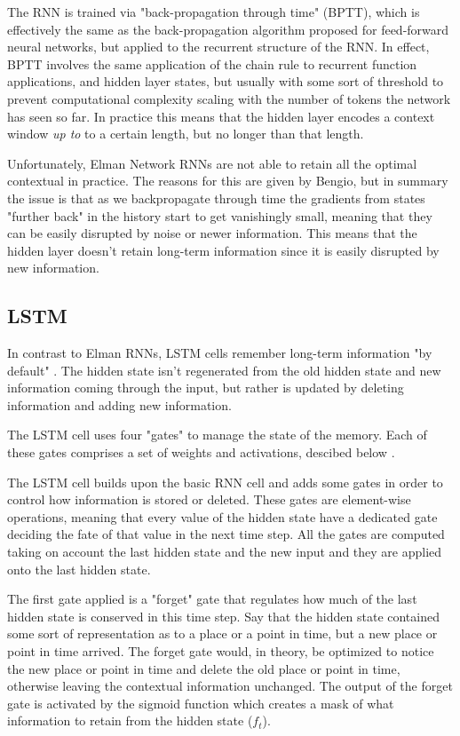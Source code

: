 \documentclass[a4paper]{article}
\begin{document}
The RNN is trained via "back-propagation through time" (BPTT), which is
effectively the same as the back-propagation algorithm proposed for feed-forward
neural networks, but applied to the recurrent structure of the RNN. In effect,
BPTT involves the same application of the chain rule to recurrent function
applications, and hidden layer states, but usually with some sort of threshold
to prevent computational complexity scaling with the number of tokens the
network has seen so far. In practice this means that the hidden layer encodes
a context window \emph{up to} to a certain length, but no longer than
that length.

Unfortunately, Elman Network RNNs are not able to retain all the optimal
contextual in practice. The reasons for this are given by Bengio\cite{Bengio94},
but in summary the issue is that as we backpropagate through time the gradients
from states "further back" in the history start to get vanishingly small, meaning
that they can be easily disrupted by noise or newer information. This means
that the hidden layer doesn't retain long-term information since it is easily
disrupted by new information.

\subsection{LSTM}
\label{sec:lstm}
In contrast to Elman RNNs, LSTM cells remember long-term information "by default" \cite{hochreiter97}.
The hidden state isn't regenerated from the old hidden state and new information coming
through the input, but rather is updated by deleting information and adding new
information.

The LSTM cell uses four "gates" to manage the state of the memory. Each of these
gates comprises a set of weights and activations, descibed below \cite{colah2015}.

The LSTM cell builds upon the basic RNN cell
and adds some gates in order to control how information is stored or deleted.
These gates are element-wise operations, meaning that every value of the hidden
state have a dedicated gate deciding the fate of that value in the next time
step. All the gates are computed taking on account the last hidden state and the
new input and they are applied onto the last hidden state.

The first gate applied is a "forget" gate that regulates how much of the last
hidden state is conserved in this time step. Say that the hidden state contained some
sort of representation as to a place or a point in time, but a new place or point in time arrived.
The forget gate would, in theory, be optimized to notice the new place or point in time and delete
the old place or point in time, otherwise leaving the contextual information unchanged. The output
of the forget gate is activated by the sigmoid function which creates a mask of what information
to retain from the hidden state ($f_t$).
\end{document}
